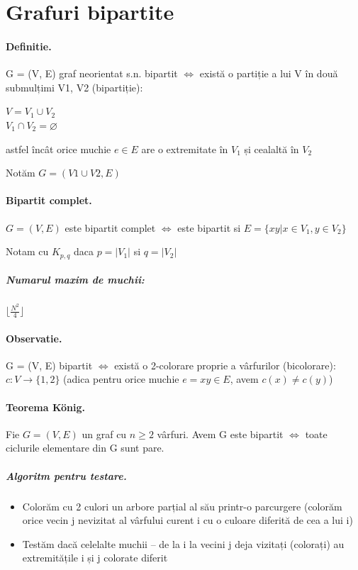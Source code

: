 \documentclass{article}
\begin{document}
\section{Grafuri bipartite}
\paragraph*{Definitie.}G = (V, E) graf neorientat s.n. bipartit $\Leftrightarrow$ există o partiție a lui V în două submulțimi V1, V2 (bipartiție):
\begin{center}
    $V = V_1 \cup V_2$\\
    $V_1 \cap V_2 = \varnothing$
\end{center}
astfel încât orice muchie $e \in E$ are o extremitate în $V_1$ și cealaltă în $V_2$
\begin{center}
    Notăm $G = (V1 \cup V2, E)$
\end{center}
\paragraph*{Bipartit complet.} $G=(V,E)$ este bipartit complet $\Leftrightarrow$ este bipartit si $E=\{xy | x \in V_1, y \in V_2 \}$
\begin{center}
    Notam cu $K_{p,q}$ daca $p = |V_1|$ si $q = |V_2|$
\end{center}
\subparagraph*{Numarul maxim de muchii:} $\lfloor\frac{N^2}{4}\rfloor$

\paragraph*{Observatie.} G = (V, E) bipartit $\Leftrightarrow$ există o 2-colorare proprie a vârfurilor (bicolorare): $c:V \rightarrow \{1,2\}$ (adica pentru orice muchie $e = xy \in E$, avem $c(x) \neq c(y)$)

\paragraph*{Teorema König.} Fie $G = (V, E)$ un graf cu $n \geq 2$ vârfuri. Avem G este bipartit $\Leftrightarrow$ toate ciclurile elementare din G sunt pare.
\subparagraph*{Algoritm pentru testare.}
\begin{itemize}
    \item Colorăm cu 2 culori un arbore parțial al său printr-o parcurgere (colorăm orice vecin j nevizitat al vârfului curent i cu o culoare
          diferită de cea a lui i)
    \item Testăm dacă celelalte muchii – de la i la vecini j deja vizitați (colorați) au extremitățile i și j colorate diferit
\end{itemize}
\end{document}
